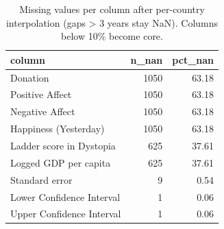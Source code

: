 \begin{table}
\caption{Missing values per column after per-country interpolation (gaps > 3 years stay NaN). Columns below 10\% become core.}
\label{tab:core-cols}
\begin{tabular}{lrr}
\toprule
column & n\_nan & pct\_nan \\
\midrule
Donation & 1050 & 63.18 \\
Positive Affect & 1050 & 63.18 \\
Negative Affect & 1050 & 63.18 \\
Happiness (Yesterday) & 1050 & 63.18 \\
Ladder score in Dystopia & 625 & 37.61 \\
Logged GDP per capita & 625 & 37.61 \\
Standard error & 9 & 0.54 \\
Lower Confidence Interval & 1 & 0.06 \\
Upper Confidence Interval & 1 & 0.06 \\
\bottomrule
\end{tabular}
\end{table}
